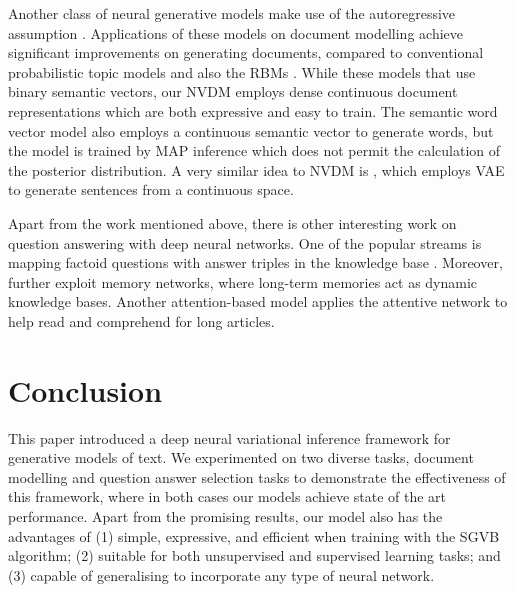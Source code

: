 \documentclass{article}
\begin{document}
Another class of neural generative models make use of the autoregressive assumption \citep{larochelle2011neural,uria2014deep,germain2015made,
gregor2013deep}. 
Applications of these models on document modelling achieve significant improvements on generating documents, compared to conventional probabilistic topic models \citep{hofmann1999probabilistic,blei2003latent} and also the RBMs \citep{hinton2009replicated,Srivastava2013}. 
While these models that use binary semantic vectors, our NVDM employs dense continuous document representations which are both expressive and easy to train. 
The semantic word vector model \citep{maas2011learning} also employs a continuous semantic vector to generate words, but the model is trained by MAP inference which does not permit the calculation of the posterior distribution.
A very similar idea to NVDM is \citet{DBLP:journals/corr/BowmanVVDJB15}, which employs VAE to generate sentences from a continuous space.

Apart from the work mentioned above, there is other interesting work on question answering with deep neural networks. One of the popular streams is mapping factoid questions with answer triples in the knowledge base \citep{Bordes:2014:EMNLP,DBLP:journals/corr/BordesWU14,DBLP:conf/acl/YihHM14}. Moreover, \citet{DBLP:journals/corr/WestonCB14,sukhbaatar2015end,DBLP:journals/corr/KumarISBEPOGS15} further exploit memory networks, where long-term memories act as dynamic knowledge bases. Another attention-based model \citep{DBLP:journals/corr/HermannKGEKSB15} applies the attentive network to help read and comprehend for long articles.

\section{Conclusion}
This paper introduced a deep neural variational inference framework for generative models of text. We experimented on two diverse tasks, document modelling and question answer selection tasks to demonstrate the effectiveness of this framework, where in both cases our models achieve state of the art performance. 
Apart from the promising results, our model also has the advantages of (1) simple, expressive, and efficient when training with the SGVB algorithm; (2) suitable for both unsupervised and supervised learning tasks; and (3) capable of generalising to incorporate any type of neural network.

\newpage


\end{document}
